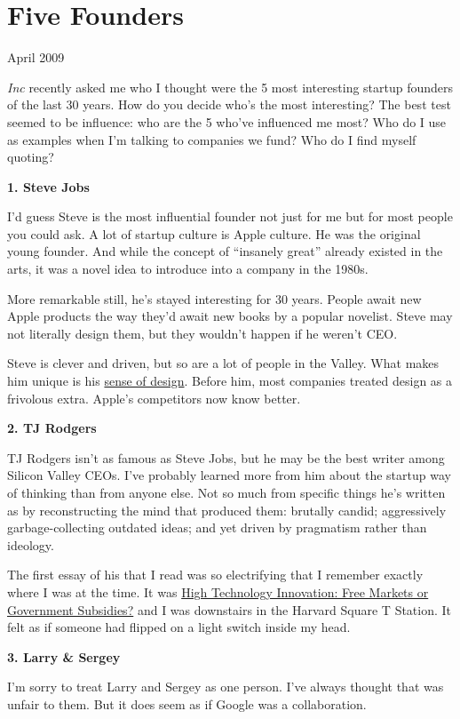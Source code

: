 \chapter{Five Founders}

April 2009

\emph{Inc} recently asked me who I thought were the 5 most interesting
startup founders of the last 30 years. How do you decide who's the most
interesting? The best test seemed to be influence: who are the 5 who've
influenced me most? Who do I use as examples when I'm talking to
companies we fund? Who do I find myself quoting?

\textbf{1. Steve Jobs}

I'd guess Steve is the most influential founder not just for me but for
most people you could ask. A lot of startup culture is Apple culture. He
was the original young founder. And while the concept of ``insanely
great'' already existed in the arts, it was a novel idea to introduce
into a company in the 1980s.

More remarkable still, he's stayed interesting for 30 years. People
await new Apple products the way they'd await new books by a popular
novelist. Steve may not literally design them, but they wouldn't happen
if he weren't CEO.

Steve is clever and driven, but so are a lot of people in the Valley.
What makes him unique is his \href{taste.html}{sense of design}. Before
him, most companies treated design as a frivolous extra. Apple's
competitors now know better.

\textbf{2. TJ Rodgers}

TJ Rodgers isn't as famous as Steve Jobs, but he may be the best writer
among Silicon Valley CEOs. I've probably learned more from him about the
startup way of thinking than from anyone else. Not so much from specific
things he's written as by reconstructing the mind that produced them:
brutally candid; aggressively garbage-collecting outdated ideas; and yet
driven by pragmatism rather than ideology.

The first essay of his that I read was so electrifying that I remember
exactly where I was at the time. It was
\href{http://www.cypress.com/?rID=34993}{High Technology Innovation:
Free Markets or Government Subsidies?} and I was downstairs in the
Harvard Square T Station. It felt as if someone had flipped on a light
switch inside my head.

\textbf{3. Larry \& Sergey}

I'm sorry to treat Larry and Sergey as one person. I've always thought
that was unfair to them. But it does seem as if Google was a
collaboration.

